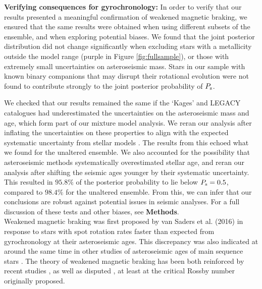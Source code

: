 \documentclass[12pt]{article}
\begin{document}
\textbf{Verifying consequences for gyrochronology:} In order to verify that our results presented a meaningful confirmation of weakened magnetic braking, we ensured that the same results were obtained when using different subsets of the ensemble, and when exploring potential biases. We found that the joint posterior distribution did not change significantly when excluding stars with a metallicity outside the model range (purple in Figure \ref{fig:fullsample}), or those with extremely small uncertainties on asteroseismic mass. Stars in our sample with known binary companions that may disrupt their rotational evolution were not found to contribute strongly to the joint posterior probability of $P_{\rm s}$. 

We checked that our results remained the same if the `Kages' and LEGACY catalogues had underestimated the uncertainties on the asteroseismic mass and age, which form part of our mixture model analysis. We reran our analysis after inflating the uncertainties on these properties to align with the expected systematic uncertainty from stellar models \cite{silvaaguirre+2015,silvaaguirre+2017}. The results from this echoed what we found for the unaltered ensemble. We also accounted for the possibility that asteroseismic methods systematically overestimated stellar age, and reran our analysis after shifting the seismic ages younger by their systematic uncertainty. This resulted in $95.8\%$ of the posterior probability to lie below $P_{\rm s} = 0.5$, compared to $98.4\%$ for the unaltered ensemble. From this, we can infer that our conclusions are robust against potential issues in seismic analyses. For a full discussion of these tests and other biases, see \textbf{Methods}.\\

Weakened magnetic braking was first proposed by van Saders et al. (2016) \cite[hereafter the `van Saders' study]{vansaders+2016} in response to stars with spot rotation rates faster than expected from gyrochronology at their asteroseismic ages. This discrepancy was also indicated at around the same time in other studies of asteroseismic ages of main sequence stars \cite{nielsen+2015, angus+2015, davies+2015}. The theory of weakened magnetic braking has been both reinforced by recent studies \cite{metcalfe+egeland2019}, as well as disputed \cite{lorenzo-oliveira+2019}, at least at the critical Rossby number originally proposed.
\end{document}
